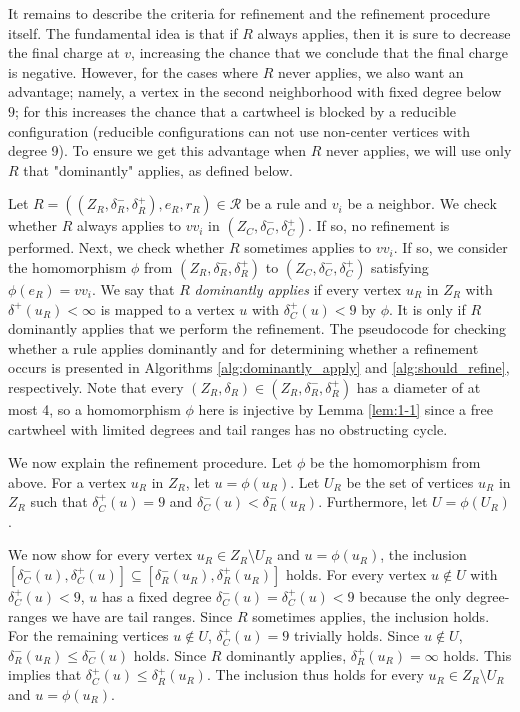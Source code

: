 \documentclass[10pt,a4paper]{article}
\begin{document}
It remains to describe the criteria for refinement and the refinement procedure itself.
The fundamental idea is that if $R$ always applies, then it is sure to decrease
the final charge at $v$, increasing the chance that we conclude that the final charge is negative. However, for the cases where $R$ never applies, we also want an advantage; namely, a vertex in the second neighborhood with fixed degree below $9$; for this increases the chance that a cartwheel is blocked by a reducible configuration (reducible configurations can not use non-center vertices with degree 9). To ensure we get this advantage when $R$ never applies, we will use only $R$ that "dominantly" applies, as defined below.

Let $R=((Z_R, \delta_R^-, \delta_R^+), e_R, r_R) \in \mathcal{R}$ be a rule and $v_i$ be a neighbor.
We check whether $R$ always applies to $vv_i$ in $(Z_C, \delta_C^-, \delta_C^+)$.
If so, no refinement is performed.
Next, we check whether $R$ sometimes applies to $vv_i$. If so, we consider the homomorphism $\phi$ from $(Z_R, \delta_R^-, \delta_R^+)$ to $(Z_C, \delta_C^-, \delta_C^+)$ satisfying $\phi(e_R)=vv_i$. We say that $R$ \emph{dominantly applies} if every vertex $u_R$ in $Z_R$ with $\delta^+(u_R) < \infty$ is mapped to a vertex $u$ with $\delta_C^+(u) < 9$ by $\phi$. It is only if $R$ dominantly applies that we perform the refinement.
The pseudocode for checking whether a rule applies dominantly and for determining whether a refinement occurs is presented in Algorithms \ref{alg:dominantly_apply} and \ref{alg:should_refine}, respectively.
Note that every $(Z_R, \delta_R) \in (Z_R, \delta_R^-, \delta_R^+)$ has a diameter of at most 4, so a homomorphism $\phi$ here is injective by Lemma \ref{lem:1-1} since a free cartwheel with limited degrees and tail ranges has no obstructing cycle.


We now explain the refinement procedure.
Let $\phi$ be the homomorphism from above.
For a vertex $u_R$ in $Z_R$, let $u=\phi(u_R)$.
Let $U_R$ be the set of vertices $u_R$ in $Z_R$ such that $\delta_C^+(u)=9$ and $\delta_C^-(u) < \delta_R^-(u_R)$.
Furthermore, let $U=\phi(U_R)$.

We now show for every vertex $u_R\in Z_R\setminus U_R$ and $u=\phi(u_R)$, the inclusion $[\delta_C^-(u), \delta_C^+(u)] \subseteq [\delta_R^-(u_R), \delta_R^+(u_R)]$ holds.
For every vertex $u \not \in U$ with $\delta_C^+(u) < 9$, $u$ has a fixed degree $\delta_C^-(u)=\delta_C^+(u) < 9$ because the only degree-ranges we have are tail ranges.
Since $R$ sometimes applies, the inclusion holds.
For the remaining vertices $u \not \in U$, $\delta_C^+(u)=9$ trivially holds.
Since $u \not \in U$, $\delta_R^-(u_R) \leq \delta_C^-(u)$ holds.
Since $R$ dominantly applies, $\delta_R^+(u_R)=\infty$ holds.
This implies that $\delta_C^+(u) \leq \delta_R^+(u_R)$.
The inclusion thus holds for every $u_R\in Z_R\setminus U_R$ and $u=\phi(u_R)$.
\end{document}
